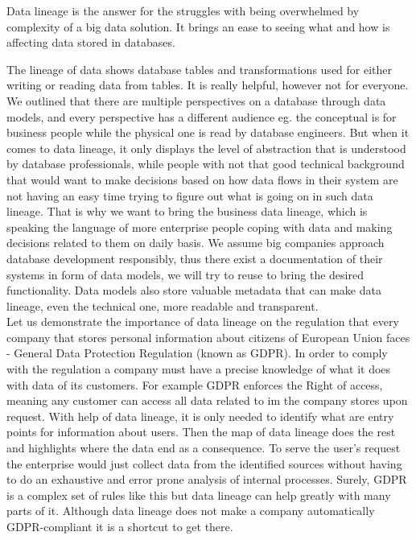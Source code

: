 Data lineage is the answer for the struggles with being overwhelmed by complexity of a big data solution. It brings an ease to seeing what and how is affecting data stored in databases.

The lineage of data shows database tables and transformations used for either writing or reading data from tables. It is really helpful, however not for everyone. 
We outlined that there are multiple perspectives on a database through data models, and every perspective has a different audience eg. the conceptual is for business people while the physical one is read by database engineers.
But when it comes to data lineage, it only displays the level of abstraction that is understood by database professionals, while people with not that good technical background that would want to make decisions based on how data flows in their system are not having an easy time trying to figure out what is going on in such data lineage.
That is why we want to bring the business data lineage, which is speaking the language of more enterprise people coping with data and making decisions related to them on daily basis. We assume big companies approach database development responsibly, thus there exist a documentation of their systems in form of data models, we will try to reuse to bring the desired functionality. Data models also store valuable metadata that can make data lineage, even the technical one, more readable and transparent. \\

Let us demonstrate the importance of data lineage on the regulation that every company that stores personal information about citizens of European Union faces - General Data Protection Regulation (known as GDPR).
In order to comply with the regulation a company must have a precise knowledge of what it does with data of its customers.  
For example GDPR enforces the Right of access\cite{RightOfAccess}, meaning any customer can access all data related to im the company stores upon request. With help of data lineage, it is only needed to identify what are entry points for information about users. Then the map of data lineage does the rest and highlights where the data end as a consequence. To serve the user's request the enterprise would just collect data from the identified sources without having to do an exhaustive and error prone analysis of internal processes.
Surely, GDPR is a complex set of rules like this but data lineage can help greatly with many parts of it. Although data lineage does not make a company automatically GDPR-compliant it is a shortcut to get there.

